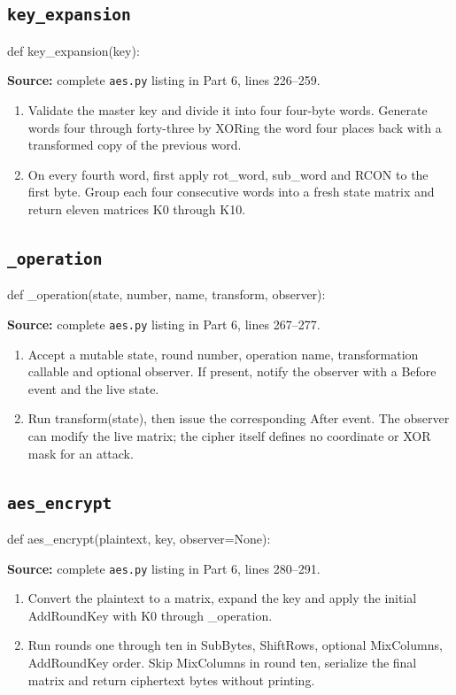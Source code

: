 \subsection{\texttt{key\_\allowbreak{}expansion}}
\begin{lightcode}
def key_expansion(key):
\end{lightcode}
\noindent\textbf{Source:} complete \texttt{aes.py} listing in Part 6, lines 226--259.
\begin{enumerate}
\item Validate the master key and divide it into four four-byte words. Generate words four through forty-three by XORing the word four places back with a transformed copy of the previous word.
\item On every fourth word, first apply rot\_word, sub\_word and RCON to the first byte. Group each four consecutive words into a fresh state matrix and return eleven matrices K0 through K10.
\end{enumerate}
\subsection{\texttt{\_\allowbreak{}operation}}
\begin{lightcode}
def _operation(state, number, name, transform, observer):
\end{lightcode}
\noindent\textbf{Source:} complete \texttt{aes.py} listing in Part 6, lines 267--277.
\begin{enumerate}
\item Accept a mutable state, round number, operation name, transformation callable and optional observer. If present, notify the observer with a Before event and the live state.
\item Run transform(state), then issue the corresponding After event. The observer can modify the live matrix; the cipher itself defines no coordinate or XOR mask for an attack.
\end{enumerate}
\subsection{\texttt{aes\_\allowbreak{}encrypt}}
\begin{lightcode}
def aes_encrypt(plaintext, key, observer=None):
\end{lightcode}
\noindent\textbf{Source:} complete \texttt{aes.py} listing in Part 6, lines 280--291.
\begin{enumerate}
\item Convert the plaintext to a matrix, expand the key and apply the initial AddRoundKey with K0 through \_operation.
\item Run rounds one through ten in SubBytes, ShiftRows, optional MixColumns, AddRoundKey order. Skip MixColumns in round ten, serialize the final matrix and return ciphertext bytes without printing.
\end{enumerate}
